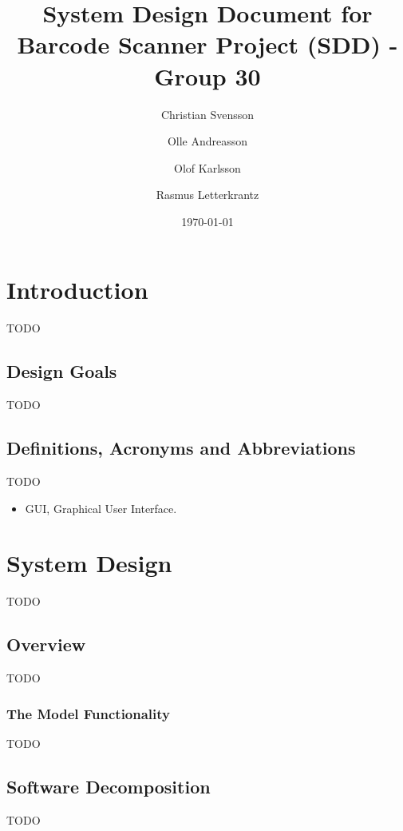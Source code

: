 \documentclass{report}
\begin{document}
\title{System Design Document for Barcode Scanner Project (SDD) - Group 30}
\author{
    Christian Svensson\\
    \and
    Olle Andreasson\\
    \and
    Olof Karlsson\\
    \and
    Rasmus Letterkrantz
}
\date{\today}
\maketitle


\begin{abstract}

\end{abstract}

\chapter{Introduction}
TODO

\section{Design Goals}
TODO

\section{Definitions, Acronyms and Abbreviations}
TODO

\begin{itemize}
    \item{GUI}, Graphical User Interface.
\end{itemize}

\chapter{System Design}
TODO

\section{Overview}
TODO

\subsection{The Model Functionality}
TODO

\section{Software Decomposition}
TODO
\end{document}
